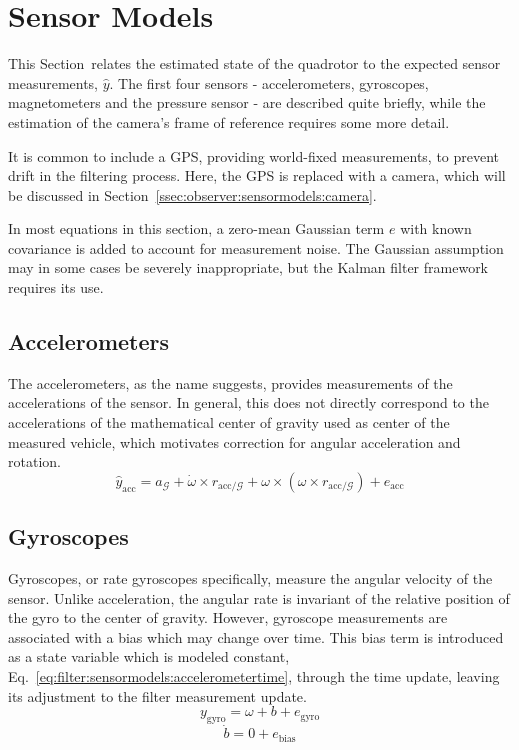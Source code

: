 \section{Sensor Models}
\label{sec:observer:sensormodels}
    This Section~relates the estimated state of the quadrotor to the expected sensor measurements, $\hat{y}$.
    The first four sensors - accelerometers, gyroscopes, magnetometers
    and the pressure sensor - are described quite briefly, while the
    estimation of the camera's frame of reference requires some more detail.

    It is common to include a GPS, providing world-fixed measurements,
    to prevent drift in the filtering process. Here, the GPS is replaced with a camera,
    which will be discussed in Section~\ref{ssec:observer:sensormodels:camera}.

    In most equations in this section, a zero-mean Gaussian term $e$ with known covariance is added
    to account for measurement noise. The Gaussian assumption may in some
    cases be severely inappropriate, but the Kalman filter framework requires its use.

    \subsection{Accelerometers}
        The accelerometers, as the name suggests, provides measurements of the
        accelerations of the sensor. In general, this does not directly correspond
        to the accelerations of the mathematical center of gravity used
        as center of the measured vehicle, which motivates correction
        for angular acceleration and rotation.
        \begin{equation}
            \hat{y}_{\text{acc}} = a_{\mathcal{G}} + \dot{\omega} \times r_{\text{acc}/\mathcal{G}} + \omega \times \left( \omega \times r_{\text{acc}/\mathcal{G}} \right) + e_{\text{acc}}
        \end{equation}

    \subsection{Gyroscopes}
        Gyroscopes, or rate gyroscopes specifically, measure the angular velocity
        of the sensor. Unlike acceleration, the angular rate is invariant of the
        relative position of the gyro to the center of gravity.
        However, gyroscope measurements are associated with a bias which may
        change over time. This bias term is introduced as a state variable which
        is modeled constant, Eq.~\eqref{eq:filter:sensormodels:accelerometertime},
        through the time update, leaving its adjustment to the filter measurement update.
        \begin{equation}
            y_{\text{gyro}} = \omega + b + e_{\text{gyro}}
        \end{equation}
        \begin{equation}
            \label{eq:filter:sensormodels:accelerometertime}
            \dot{b} = 0 + e_{\text{bias}}
        \end{equation}

